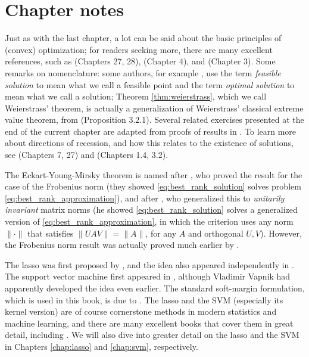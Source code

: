 \SkipTocEntry\section*{Chapter notes}

Just as with the last chapter, a lot can be said about the basic principles of
(convex) optimization; for readers seeking more, there are many excellent
references, such as \cite{rockafellar1970convex} (Chapters 27, 28),
\cite{boyd2004convex} (Chapter 4), and \cite{bertsekas2009convex} (Chapter 3).
Some remarks on nomenclature: some authors, for example
\cite{rockafellar1970convex, bertsekas2009convex}, use the term \emph{feasible
  solution} to mean what we call a feasible point and the term \emph{optimal
  solution} to mean what we call a solution; Theorem \ref{thm:weierstrass},
which we call Weierstrass' theorem, is actually a generalization of Weierstrass' 
classical extreme value theorem, from \cite{bertsekas2009convex} (Proposition 
3.2.1). Several related exercises presented at the end of the current chapter
are adapted from proofs of results in \cite{bertsekas2009convex}. To learn more 
about directions of recession, and how this relates to the existence of
solutions, see \cite{rockafellar1970convex} (Chapters 7, 27) and
\cite{bertsekas2009convex} (Chapters 1.4, 3.2).

The Eckart-Young-Mirsky theorem is named after \cite{eckart1936approximation},
who proved the result for the case of the Frobenius norm (they showed
\eqref{eq:best_rank_solution} solves problem
\eqref{eq:best_rank_approximation}), and after \cite{mirsky1960symmetric}, who
generalized this to \emph{unitarily invariant} matrix norms (he showed
\eqref{eq:best_rank_solution} solves a generalized version of
\eqref{eq:best_rank_approximation}, in which the criterion uses any norm  
$\|\cdot\|$ that satisfies $\|U A V\| = \|A\|$, for any $A$ and orthogonal
$U,V$). However, the Frobenius norm result was actually proved much earlier by  
\cite{schmidt1907theorie}. 

The lasso was first proposed by \cite{tibshirani1996regression}, and the idea
also appeared independently in \cite{chen1998atomic}. The support vector machine
first appeared in \cite{boser1992training}, although Vladimir Vapnik had
apparently developed the idea even earlier. The standard soft-margin
formulation, which is used in this book, is due to \cite{cortes1995support}. The
lasso and the SVM (especially its kernel version) are of course cornerstone
methods in modern statistics and machine learning, and there are many excellent
books that cover them in great detail, including \cite{hastie2009elements,
  scholkopf2002learning, hastie2015statistical}. We will also dive into greater
detail on the lasso and the SVM in Chapters \ref{chap:lasso} and \ref{chap:svm},
respectively.   

